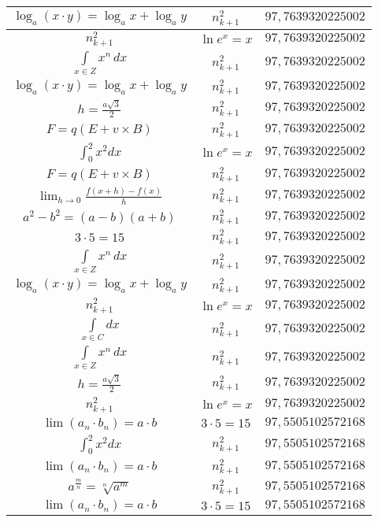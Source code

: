 \documentclass{article}
\begin{document}
\begin{flushleft}
\begin{longtable}{|c|c|c|}
$\log_{a}(x\cdot y)=\log_{a}x+\log_{a}y$ & $n_{k+1}^2$ & $97,7639320225002$ \\ \hline 
$n_{k+1}^2$ & $\ln e^x=x$ & $97,7639320225002$ \\ \hline 
$\int \limits_{x\in Z}\!x^{n}\,dx$ & $n_{k+1}^2$ & $97,7639320225002$ \\ \hline 
$\log_{a}(x\cdot y)=\log_{a}x+\log_{a}y$ & $n_{k+1}^2$ & $97,7639320225002$ \\ \hline 
$h=\frac{a\sqrt{3}}{2}$ & $n_{k+1}^2$ & $97,7639320225002$ \\ \hline 
$F=q\left(E+v\times B\right)$ & $n_{k+1}^2$ & $97,7639320225002$ \\ \hline 
$\int _0^2x^2dx$ & $\ln e^x=x$ & $97,7639320225002$ \\ \hline 
$F=q\left(E+v\times B\right)$ & $n_{k+1}^2$ & $97,7639320225002$ \\ \hline 
$\lim_{h\to0}\frac{f(x+h)-f(x)}{h}$ & $n_{k+1}^2$ & $97,7639320225002$ \\ \hline 
$a^2-b^2=(a-b)(a+b)$ & $n_{k+1}^2$ & $97,7639320225002$ \\ \hline 
$3\cdot 5=15$ & $n_{k+1}^2$ & $97,7639320225002$ \\ \hline 
$\int \limits_{x\in Z}\!x^{n}\,dx$ & $n_{k+1}^2$ & $97,7639320225002$ \\ \hline 
$\log_{a}(x\cdot y)=\log_{a}x+\log_{a}y$ & $n_{k+1}^2$ & $97,7639320225002$ \\ \hline 
$n_{k+1}^2$ & $\ln e^x=x$ & $97,7639320225002$ \\ \hline 
$\int \limits_{x\in C}dx$ & $n_{k+1}^2$ & $97,7639320225002$ \\ \hline 
$\int \limits_{x\in Z}\!x^{n}\,dx$ & $n_{k+1}^2$ & $97,7639320225002$ \\ \hline 
$h=\frac{a\sqrt{3}}{2}$ & $n_{k+1}^2$ & $97,7639320225002$ \\ \hline 
$n_{k+1}^2$ & $\ln e^x=x$ & $97,7639320225002$ \\ \hline 
$\lim\left(a_n\cdot b_n\right)=a\cdot b$ & $3\cdot 5=15$ & $97,5505102572168$ \\ \hline 
$\int _0^2x^2dx$ & $n_{k+1}^2$ & $97,5505102572168$ \\ \hline 
$\lim\left(a_n\cdot b_n\right)=a\cdot b$ & $n_{k+1}^2$ & $97,5505102572168$ \\ \hline 
$a^{\frac{m}{n}}=\sqrt[n]{a^{m}}$ & $n_{k+1}^2$ & $97,5505102572168$ \\ \hline 
$\lim\left(a_n\cdot b_n\right)=a\cdot b$ & $3\cdot 5=15$ & $97,5505102572168$ \\ \hline 

\end{longtable}
\end{flushleft}
\end{document}
